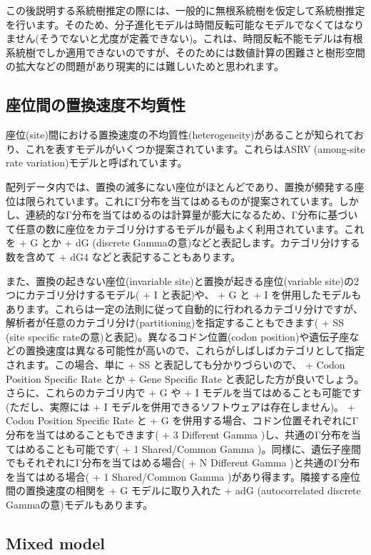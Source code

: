 \documentclass[titlepage,10pt,a4paper]{jsbook}
\begin{document}
この後説明する系統樹推定の際には、一般的に無根系統樹を仮定して系統樹推定を行います。そのため、分子進化モデルは時間反転可能なモデルでなくてはなりません(そうでないと尤度が定義できない)。これは、時間反転不能モデルは有根系統樹でしか適用できないのですが、そのためには数値計算の困難さと樹形空間の拡大などの問題があり現実的には難しいためと思われます。

\subsection{座位間の置換速度不均質性}

座位(site)間における置換速度の不均質性(heterogeneity)があることが知られており、これを表すモデルがいくつか提案されています。これらはASRV (among-site rate variation)モデルと呼ばれています。

配列データ内では、置換の滅多にない座位がほとんどであり、置換が頻発する座位は限られています。これにΓ分布を当てはめるものが提案されています\citep{Yang1993}。しかし、連続的なΓ分布を当てはめるのは計算量が膨大になるため、Γ分布に基づいて任意の数に座位をカテゴリ分けするモデル\citep{Yang1994}が最もよく利用されています。これを + G とか + dG (discrete Gammaの意)などと表記します。カテゴリ分けする数を含めて + dG4 などと表記することもあります。

また、置換の起きない座位(invariable site)と置換が起きる座位(variable site)の2つにカテゴリ分けするモデル( + I と表記)や、 + G と + I を併用したモデルもあります。これらは一定の法則に従って自動的に行われるカテゴリ分けですが、解析者が任意のカテゴリ分け(partitioning)を指定することもできます( + SS (site specific rateの意)と表記)。異なるコドン位置(codon position)や遺伝子座などの置換速度は異なる可能性が高いので、これらがしばしばカテゴリとして指定されます。この場合、単に + SS と表記しても分かりづらいので、 + Codon Position Specific Rate とか + Gene Specific Rate と表記した方が良いでしょう。さらに、これらのカテゴリ内で + G や + I モデルを当てはめることも可能です(ただし、実際には + I モデルを併用できるソフトウェアは存在しません)。 + Codon Position Specific Rate と + G を併用する場合、コドン位置それぞれにΓ分布を当てはめることもできます( + 3 Different Gamma )し、共通のΓ分布を当てはめることも可能です( + 1 Shared/Common Gamma )。同様に、遺伝子座間でもそれぞれにΓ分布を当てはめる場合( + N Different Gamma )と共通のΓ分布を当てはめる場合( + 1 Shared/Common Gamma )があり得ます。隣接する座位間の置換速度の相関を + G モデルに取り入れた + adG (autocorrelated discrete Gammaの意)モデルもあります\citep{Yang1995}。

\subsection{Mixed model}
\end{document}
